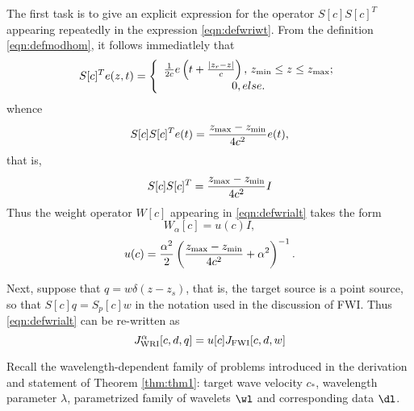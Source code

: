 The first task is to give an explicit expression for the operator $S[c]S[c]^T$ appearing repeatedly in the expression \ref{eqn:defwriwt}. From the definition \ref{eqn:defmodhom}, it follows immediatlely that 
\begin{equation}
  \label{eqn:modhomtrans}
S[c]^Te(z,t)=
\left\{
    \begin{array}{c}
      \frac{1}{2c}e\left(t +  \frac{|z_r-z|}{c}\right), \,z_{\rm min} \le z \le z_{\rm max};\\
      0, else.
    \end{array}
  \right.
\end{equation}
whence
\[
  S[c]S[c]^Te(t) = \frac{z_{\rm max}-z_{\rm min}}{4c^2}e(t),
\]
that is,
\begin{equation}
  \label{eqn:modhomnormal}
  S[c]S[c]^T = \frac{z_{\rm max}-z_{\rm min}}{4c^2}I
\end{equation}
Thus the weight operator $W[c]$ appearing in \ref{eqn:defwrialt} takes
the form
\[
  W_{\alpha}[c] = u(c) I,
\]
\begin{equation}
  \label{eqn:wriwthom}
u(c) = \frac{\alpha^2}{2}\left(\frac{z_{\rm max}-z_{\rm min}}{4c^2}+\alpha^2\right)^{-1}.
\end{equation}

Next, suppose that $q = w\delta(z-z_s)$, that is, the target source is
a point source, so that $S[c]q = S_p[c]w$ in the notation used in
the discussion of FWI. Thus \ref{eqn:defwrialt} can be re-written as
\begin{equation}
  \label{eqn:wriscrewed}
  J_{\rm WRI}^{\alpha}[c,d,q]=u[c]J_{\rm FWI}[c,d,w]
\end{equation}

Recall the wavelength-dependent family of problems introduced in the derivation and
statement of Theorem \ref{thm:thm1}: target wave velocity $c_*$, wavelength parameter
$\lambda$, parametrized family of wavelets $\wl$ and corresponding
data $\dl$.

